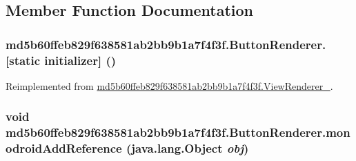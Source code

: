 \subsection{Member Function Documentation}
\hypertarget{classmd5b60ffeb829f638581ab2bb9b1a7f4f3f_1_1_button_renderer_1a326f88f9ee0dcf3f66aa1ab755f41e}{
\subsubsection[{[static initializer]}]{\setlength{\rightskip}{0pt plus 5cm}md5b60ffeb829f638581ab2bb9b1a7f4f3f.ButtonRenderer.\mbox{[}static initializer\mbox{]} ()}}
\label{classmd5b60ffeb829f638581ab2bb9b1a7f4f3f_1_1_button_renderer_1a326f88f9ee0dcf3f66aa1ab755f41e}




Reimplemented from \hyperlink{classmd5b60ffeb829f638581ab2bb9b1a7f4f3f_1_1_view_renderer__2_a0898cf56fa9a49b653470eaf1608e77}{md5b60ffeb829f638581ab2bb9b1a7f4f3f.ViewRenderer\_}.\hypertarget{classmd5b60ffeb829f638581ab2bb9b1a7f4f3f_1_1_button_renderer_64b38ed3e683851f4be2246223c6cab5}{
\subsubsection[{monodroidAddReference}]{\setlength{\rightskip}{0pt plus 5cm}void md5b60ffeb829f638581ab2bb9b1a7f4f3f.ButtonRenderer.monodroidAddReference (java.lang.Object {\em obj})}}
\label{classmd5b60ffeb829f638581ab2bb9b1a7f4f3f_1_1_button_renderer_64b38ed3e683851f4be2246223c6cab5}




